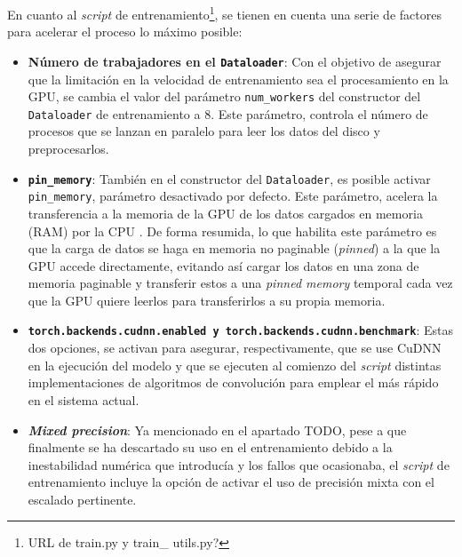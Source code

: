 En cuanto al \textit{script} de entrenamiento\footnote{URL de train.py y train\_ utils.py?}, se tienen en cuenta una serie de factores para acelerar el proceso lo máximo posible:
\begin{itemize}

\item \textbf{Número de trabajadores en el \texttt{Dataloader}}: Con el objetivo de asegurar que la limitación en la velocidad de entrenamiento sea el procesamiento en la GPU, se cambia el valor del parámetro \texttt{num\_workers} del constructor del \texttt{Dataloader} de entrenamiento a 8. Este parámetro, controla el número de procesos que se lanzan en paralelo para leer los datos del disco y preprocesarlos.

\item \textbf{\texttt{pin\_memory}}: También en el constructor del \texttt{Dataloader}, es posible activar \texttt{pin\_memory}, parámetro desactivado por defecto. Este parámetro, acelera la transferencia a la memoria de la GPU de los datos cargados en memoria (RAM) por la CPU \cite{harris2012}. De forma resumida, lo que habilita este parámetro es que la carga de datos se haga en memoria no paginable (\textit{pinned}) a la que la GPU accede directamente, evitando así cargar los datos en una zona de memoria paginable y transferir estos a una \textit{pinned memory} temporal cada vez que la GPU quiere leerlos para transferirlos a su propia memoria.

\item \textbf{\texttt{torch.backends.cudnn.enabled y \texttt{torch.backends.cudnn.benchmark}}}: Estas dos opciones, se activan para asegurar, respectivamente, que se use CuDNN en la ejecución del modelo y que se ejecuten al comienzo del \textit{script} distintas implementaciones de algoritmos de convolución para emplear el más rápido en el sistema actual.

\item \textbf{\textit{Mixed precision}}: Ya mencionado en el apartado TODO, pese a que finalmente se ha descartado su uso en el entrenamiento debido a la inestabilidad numérica que introducía y los fallos que ocasionaba, el \textit{script} de entrenamiento incluye la opción de activar el uso de precisión mixta con el escalado pertinente.
\end{itemize}

